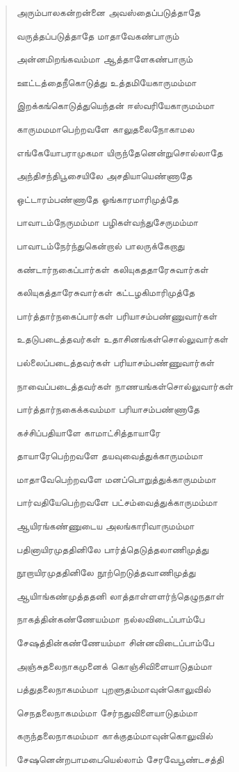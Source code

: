 \documentclass{article}
\begin{document}
\begin{quotation}
{அரும்பாலகன்றன்னை அவஸ்தைப்படுத்தாதே

வருத்தப்படுத்தாதே மாதாவேகண்பாரும்

அன்னமிறங்கவம்மா ஆத்தாளேகண்பாரும்

ஊட்டத்தைநீகொடுத்து உத்தமியேகாருமம்மா

இறக்கங்கொடுத்துயெந்தன் ஈஸ்வரியேகாருமம்மா

காருமமமாபெற்றவளே காலுதலைநோகாமல

எங்கேயோபராமுகமா யிருந்தேனென்றுசொல்லாதே

அந்திசந்திபூசையிலே அசதியாயெண்ணாதே

ஒட்டாரம்பண்ணாதே ஓங்காரமாரிமுத்தே

பாவாடம்நேருமம்மா பழிகள்வந்துசேருமம்மா

பாவாடம்நேர்ந்துகென்றால் பாலருக்கேறாது

கண்டார்நகைப்பார்கள் கலியுகததாரேசுவார்கள்

கலியுகத்தாரேசுவார்கள் கட்டழகிமாரிமுத்தே

பார்த்தார்நகைப்பார்கள் பரியாசம்பண்ணுவார்கள்

உதடுபடைத்தவர்கள் உதாசினங்கள்சொல்லுவார்கள்

பல்லைப்படைத்தவர்கள் பரியாசம்பண்ணுவார்கள்

நாவைப்படைத்தவர்கள் நாணயங்கள்சொல்லுவார்கள்

பார்த்தார்நகைக்கவம்மா பரியாசம்பண்ணாதே

கச்சிப்பதியாளே காமாட்சித்தாயாரே

தாயாரேபெற்றவளே தயவுவைத்துக்காருமம்மா

மாதாவேபெற்றவளே மனப்பொறுத்துக்காருமம்மா

பார்வதியேபெற்றவளே பட்சம்வைத்துக்காருமம்மா

ஆயிரங்கண்ணுடைய அலங்காரிவாருமம்மா

பதினாயிரமுததினிலே பார்த்தெடுத்தலாணிமுத்து

நூறாயிரமுததினிலே நூற்றெடுத்தவாணிமுத்து

ஆயிாங்கண்‌முத்ததனி லாத்தாள்ளளர்ந்தெழுநதாள்‌

நாகத்தின்கண்ணேயம்மா நல்லவிடைப்பாம்பே

சேஷத்தின்கண்ணேயம்மா சின்னவிடைப்பாம்பே

அஞ்சுதலைநாகமுனைக் கொஞ்சிவிளையாடுதம்மா

பத்துதலைநாகமம்மா புறளுதம்மாவுன்கொலுவில்

செநதலைநாகமம்மா சேர்நதுவிளையாடுதம்மா

கருந்தலைநாகமம்மா காக்குதம்மாவுன்கொலுவில்

சேஷனென்றபாமபையெல்லாம் சேரவேபூண்டசத்தி

}
\end{quotation}
\end{document}
